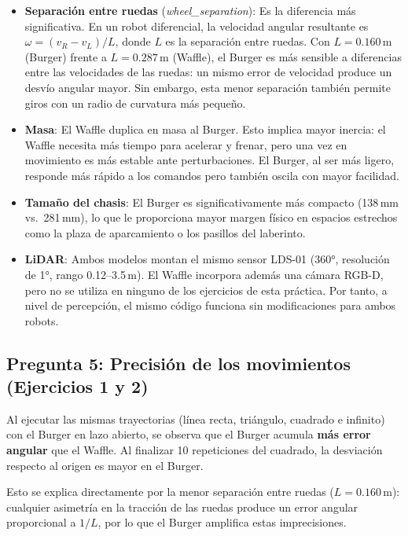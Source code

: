 \begin{itemize}
	\item \textbf{Separación entre ruedas} (\textit{wheel\_separation}): Es la diferencia más significativa. En un robot diferencial, la velocidad angular resultante es $\omega = (v_R - v_L) / L$, donde $L$ es la separación entre ruedas. Con $L = 0.160\,\text{m}$ (Burger) frente a $L = 0.287\,\text{m}$ (Waffle), el Burger es más sensible a diferencias entre las velocidades de las ruedas: un mismo error de velocidad produce un desvío angular mayor. Sin embargo, esta menor separación también permite giros con un radio de curvatura más pequeño.
	
	\item \textbf{Masa}: El Waffle duplica en masa al Burger. Esto implica mayor inercia: el Waffle necesita más tiempo para acelerar y frenar, pero una vez en movimiento es más estable ante perturbaciones. El Burger, al ser más ligero, responde más rápido a los comandos pero también oscila con mayor facilidad.
	
	\item \textbf{Tamaño del chasis}: El Burger es significativamente más compacto (138\,mm vs.\ 281\,mm), lo que le proporciona mayor margen físico en espacios estrechos como la plaza de aparcamiento o los pasillos del laberinto.
	
	\item \textbf{LiDAR}: Ambos modelos montan el mismo sensor LDS-01 (360°, resolución de 1°, rango 0.12--3.5\,m). El Waffle incorpora además una cámara RGB-D, pero no se utiliza en ninguno de los ejercicios de esta práctica. Por tanto, a nivel de percepción, el mismo código funciona sin modificaciones para ambos robots.
\end{itemize}

\subsection*{Pregunta 5: Precisión de los movimientos (Ejercicios 1 y 2)}

Al ejecutar las mismas trayectorias (línea recta, triángulo, cuadrado e infinito) con el Burger en lazo abierto, se observa que el Burger acumula \textbf{más error angular} que el Waffle. Al finalizar 10 repeticiones del cuadrado, la desviación respecto al origen es mayor en el Burger.

Esto se explica directamente por la menor separación entre ruedas ($L = 0.160\,\text{m}$): cualquier asimetría en la tracción de las ruedas produce un error angular proporcional a $1/L$, por lo que el Burger amplifica estas imprecisiones.

